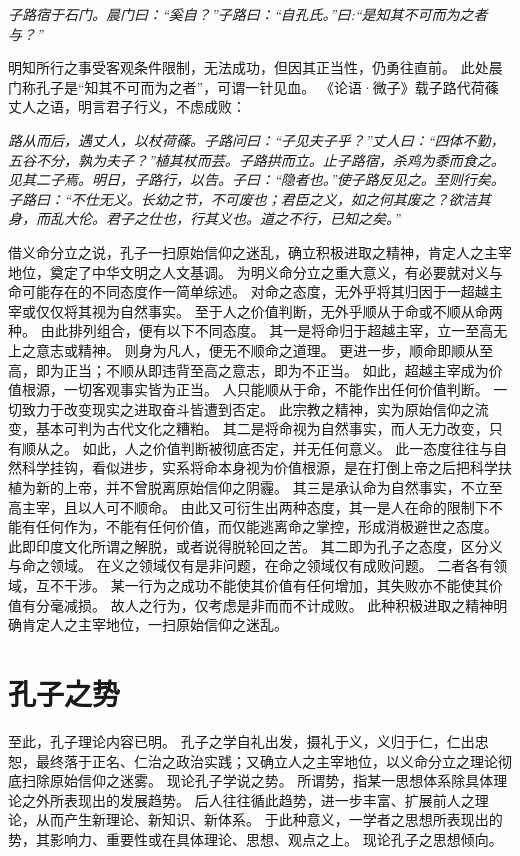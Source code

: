 \documentclass[11pt]{article}
\begin{document}
\textit{子路宿于石门。晨门曰：“奚自？”子路曰：“自孔氏。”曰:“是知其不可而为之者与？”}

明知所行之事受客观条件限制，无法成功，但因其正当性，仍勇往直前。
此处晨门称孔子是“知其不可而为之者”，可谓一针见血。
《论语·微子》载子路代荷蓧丈人之语，明言君子行义，不虑成败：

\textit{路从而后，遇丈人，以杖荷蓧。子路问曰：“子见夫子乎？”丈人曰：“四体不勤，五谷不分，孰为夫子？”植其杖而芸。子路拱而立。止子路宿，杀鸡为黍而食之。见其二子焉。明日，子路行，以告。子曰：“隐者也。”使子路反见之。至则行矣。子路曰：“不仕无义。长幼之节，不可废也；君臣之义，如之何其废之？欲洁其身，而乱大伦。君子之仕也，行其义也。道之不行，已知之矣。”}

\par

借义命分立之说，孔子一扫原始信仰之迷乱，确立积极进取之精神，肯定人之主宰地位，奠定了中华文明之人文基调。
为明义命分立之重大意义，有必要就对义与命可能存在的不同态度作一简单综述。
对命之态度，无外乎将其归因于一超越主宰或仅仅将其视为自然事实。
至于人之价值判断，无外乎顺从于命或不顺从命两种。
由此排列组合，便有以下不同态度。
其一是将命归于超越主宰，立一至高无上之意志或精神。
则身为凡人，便无不顺命之道理。
更进一步，顺命即顺从至高，即为正当；不顺从即违背至高之意志，即为不正当。
如此，超越主宰成为价值根源，一切客观事实皆为正当。
人只能顺从于命，不能作出任何价值判断。
一切致力于改变现实之进取奋斗皆遭到否定。
此宗教之精神，实为原始信仰之流变，基本可判为古代文化之糟粕。
其二是将命视为自然事实，而人无力改变，只有顺从之。
如此，人之价值判断被彻底否定，并无任何意义。
此一态度往往与自然科学挂钩，看似进步，实系将命本身视为价值根源，是在打倒上帝之后把科学扶植为新的上帝，并不曾脱离原始信仰之阴霾。
其三是承认命为自然事实，不立至高主宰，且以人可不顺命。
由此又可衍生出两种态度，其一是人在命的限制下不能有任何作为，不能有任何价值，而仅能逃离命之掌控，形成消极避世之态度。
此即印度文化所谓之解脱，或者说得脱轮回之苦。
其二即为孔子之态度，区分义与命之领域。
在义之领域仅有是非问题，在命之领域仅有成败问题。
二者各有领域，互不干涉。
某一行为之成功不能使其价值有任何增加，其失败亦不能使其价值有分毫减损。
故人之行为，仅考虑是非而而不计成败。
此种积极进取之精神明确肯定人之主宰地位，一扫原始信仰之迷乱。

\section{孔子之势}
至此，孔子理论内容已明。
孔子之学自礼出发，摄礼于义，义归于仁，仁出忠恕，最终落于正名、仁治之政治实践；又确立人之主宰地位，以义命分立之理论彻底扫除原始信仰之迷雾。
现论孔子学说之势。
所谓势，指某一思想体系除具体理论之外所表现出的发展趋势。
后人往往循此趋势，进一步丰富、扩展前人之理论，从而产生新理论、新知识、新体系。
于此种意义，一学者之思想所表现出的势，其影响力、重要性或在具体理论、思想、观点之上。
现论孔子之思想倾向。
\end{document}
